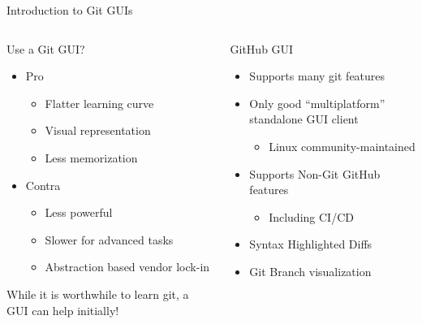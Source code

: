\documentclass[compress,aspectratio=169]{beamer}
\begin{document}
	\begin{frame}{Introduction to Git GUIs}
    \begin{columns}
      \begin{column}{0.5\textwidth}
        \begin{block}{Use a Git GUI?}
          \begin{itemize}
            \item Pro
              \begin{itemize}
                \item Flatter learning curve
                \item Visual representation
                \item Less memorization
              \end{itemize}
            \item Contra
              \begin{itemize}
                \item Less powerful
                \item Slower for advanced tasks
                \item Abstraction based vendor lock-in
              \end{itemize}
          \end{itemize}
          \begin{center}
            While it is worthwhile to learn git, a GUI can help initially!
          \end{center}
        \end{block}
      \end{column}
      \pause
      \begin{column}{0.5\textwidth}
        \begin{block}{GitHub GUI}
          \begin{itemize}
            \item Supports many git features
            \item Only good ``multiplatform'' standalone GUI client
              \begin{itemize}
                \item Linux community-maintained
              \end{itemize}
            \item Supports Non-Git GitHub features
              \begin{itemize}
                \item Including CI/CD
              \end{itemize}
            \item Syntax Highlighted Diffs
            \item Git Branch visualization
          \end{itemize}
        \end{block}
      \end{column}
    \end{columns}
	\end{frame}
\end{document}
